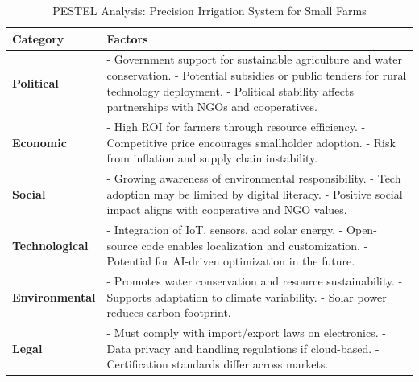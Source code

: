 \documentclass{IEEEtran}
\begin{document}
\begin{table}
    \caption{PESTEL Analysis: Precision Irrigation System for Small Farms}
    \label{tab: PESTEL}
    \centering
        \renewcommand{\arraystretch}{1.4}
        \begin{tabular}{|p{3cm}|p{11cm}|}
        \hline
        \textbf{Category} & \textbf{Factors} \\
        \hline
        \textbf{Political} & 
        - Government support for sustainable agriculture and water conservation. \newline
        - Potential subsidies or public tenders for rural technology deployment. \newline
        - Political stability affects partnerships with NGOs and cooperatives. \\
        \hline
        \textbf{Economic} & 
        - High ROI for farmers through resource efficiency. \newline
        - Competitive price encourages smallholder adoption. \newline
        - Risk from inflation and supply chain instability. \\
        \hline
        \textbf{Social} & 
        - Growing awareness of environmental responsibility. \newline
        - Tech adoption may be limited by digital literacy. \newline
        - Positive social impact aligns with cooperative and NGO values. \\
        \hline
        \textbf{Technological} & 
        - Integration of IoT, sensors, and solar energy. \newline
        - Open-source code enables localization and customization. \newline
        - Potential for AI-driven optimization in the future. \\
        \hline
        \textbf{Environmental} & 
        - Promotes water conservation and resource sustainability. \newline
        - Supports adaptation to climate variability. \newline
        - Solar power reduces carbon footprint. \\
        \hline
        \textbf{Legal} & 
        - Must comply with import/export laws on electronics. \newline
        - Data privacy and handling regulations if cloud-based. \newline
        - Certification standards differ across markets. \\
        \hline
    \end{tabular}
\end{table}
\end{document}
